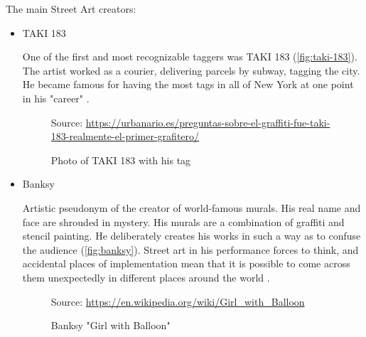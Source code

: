 \documentclass{report}
\begin{document}
    \medskip
The main Street Art creators:
    \begin{itemize}
    \item{TAKI 183}
    
	One of the first and most recognizable taggers was TAKI 183 (\autoref{fig:taki-183}). The artist worked as a courier, delivering parcels by subway, tagging the city. He became famous for having the most tags in all of New York at one point in his "career" \cite{WEBSITE:1}.
	
	\begin{figure}[h]
\center
{} {Source: \url{https://urbanario.es/preguntas-sobre-el-graffiti-fue-taki-183-realmente-el-primer-grafitero/}}
\caption{Photo of TAKI 183 with his tag}
\label{fig:taki-183}
\end{figure}
    
    
    \item{Banksy}
    
	Artistic pseudonym of the creator of world-famous murals. His real name and face are shrouded in mystery. His murals are a combination of graffiti and stencil painting. He deliberately creates his works in such a way as to confuse the audience (\autoref{fig:banksy}). Street art in his performance forces to think, and accidental places of implementation mean that it is possible to come across them unexpectedly in different places around the world \cite{WEBSITE:1}.
	
	\begin{figure}[h]
\center
{} {Source: \url{https://en.wikipedia.org/wiki/Girl_with_Balloon}}
\caption{Banksy "Girl with Balloon"}
\label{fig:banksy}
\end{figure}	
	
    \end{itemize}
    
\end{document}

